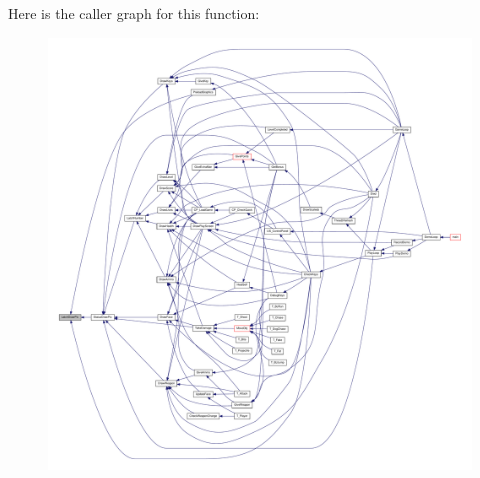 Here is the caller graph for this function:
\nopagebreak
\begin{figure}[H]
\begin{center}
\leavevmode
\includegraphics[width=400pt]{ID__VH_8H_a0170b65c8e23e18b960bde1e8908887b_icgraph}
\end{center}
\end{figure}


